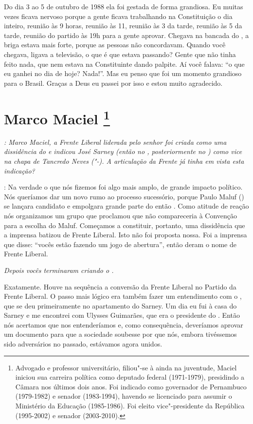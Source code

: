 Do dia 3 ao 5 de outubro de 1988 ela foi gestada de forma grandiosa. Eu
muitas vezes ficava nervoso porque a gente ficava trabalhando na
Constituição o dia inteiro, reunião às 9 horas, reunião às 11, reunião
às 3 da tarde, reunião às 5 da tarde, reunião do partido às 19h para a
gente aprovar. Chegava na bancada do , a briga estava mais forte,
porque as pessoas não concordavam. Quando você chegava, ligava a
televisão, o que é que estava passando? Gente que não tinha feito nada,
que nem estava na Constituinte dando palpite. Aí você falava: ``o que eu
ganhei no dia de hoje? Nada!''. Mas eu penso que foi um momento
grandioso para o Brasil. Graças a Deus eu passei por isso e estou muito
agradecido.

\chapter{Marco Maciel
\footnote{Advogado e professor universitário, filiou"-se à  ainda na
juventude, Maciel iniciou sua carreira política como deputado federal
(1971-1979), presidindo a Câmara nos últimos dois anos. Foi indicado
como governador de Pernambuco (1979-1982) e senador (1983-1994), havendo
se licenciado para assumir o Ministério da Educação (1985-1986). Foi
eleito vice"-presidente da República (1995-2002) e senador (2003-2010).}}

\emph{: Marco Maciel, a Frente Liberal liderada pelo senhor foi criada
como uma dissidência do  e indicou José Sarney (então no ,
posteriormente no ) como vice na chapa de Tancredo Neves
("-). A articulação da Frente já tinha em vista
esta indicação?}

: Na verdade o que nós fizemos foi algo mais amplo,
de grande impacto político. Nós queríamos dar um novo rumo ao processo
sucessório, porque Paulo Maluf () se lançara candidato e empolgara
grande parte do então . Como atitude de reação nós organizamos um
grupo que proclamou que não compareceria à Convenção para a escolha do
Maluf. Começamos a constituir, portanto, uma dissidência que a imprensa
batizou de Frente Liberal. Isto não foi proposta nossa. Foi a imprensa
que disse: ``vocês estão fazendo um jogo de abertura'', então deram o
nome de Frente Liberal.

\medskip

\emph{Depois vocês terminaram criando o .}

Exatamente. Houve na sequência a conversão da Frente
Liberal no Partido da Frente Liberal. O passo mais lógico era também
fazer um entendimento com o , que se deu primeiramente no
apartamento do Sarney. Um dia eu fui à casa do Sarney e me encontrei com
Ulysses Guimarães, que era o presidente do . Então nós acertamos que
nos entenderíamos e, como consequência, deveríamos aprovar um documento
para que a sociedade soubesse por que nós, embora tivéssemos sido
adversários no passado, estávamos agora unidos.

